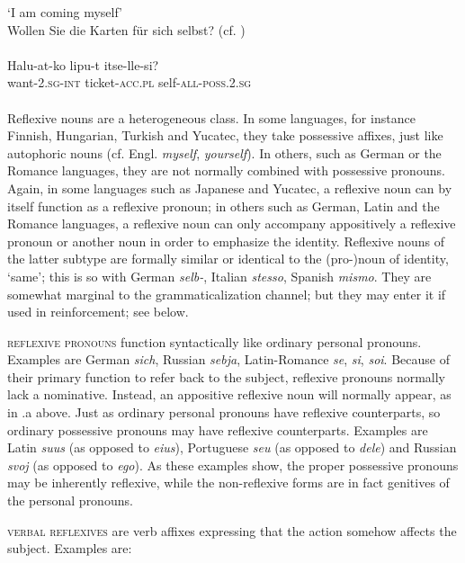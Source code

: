 \glt ‘I am coming myself’\\
\ex 
\glt Wollen Sie die Karten für sich selbst?  (cf. )\\
\z
\z
\noindent \ea\label{ex:E15}
\langinfo{\LangFinn}{}{}\\
\gll Halu-at-ko  lipu-t  itse-lle-si?\\
 want-2.\textsc{sg}-\textsc{int}  ticket-\textsc{acc}.\textsc{pl}  self-\textsc{all}-\textsc{poss}.2.\textsc{sg}\\
\\
\z
\noindent 
Reflexive nouns are a heterogeneous class. In some languages, for instance Finnish, Hungarian, Turkish and Yucatec, they take possessive affixes, just like autophoric nouns (cf. Engl. \textit{myself}, \textit{yourself}). In others, such as German or the Romance languages, they are not normally combined with possessive pronouns. Again, in some languages such as Japanese and Yucatec, a reflexive noun can by itself function as a reflexive pronoun; in others such as German, Latin and the Romance languages, a reflexive noun can only accompany appositively a reflexive pronoun or another noun in order to emphasize the identity. Reflexive nouns of the latter subtype are formally similar or identical to the (pro-)noun of identity, ‘same’; this is so with German \textit{selb-}, Italian \textit{stesso}, Spanish \textit{mismo}. They are somewhat marginal to the grammaticalization channel; but they may enter it if used in reinforcement; see below.

\textsc{reflexive pronouns} function syntactically like ordinary personal pronouns. Examples are German \textit{sich}, Russian \textit{sebja}, Latin-Romance \textit{se}, \textit{si}, \textit{soi}. Because of their primary function to refer back to the subject, reflexive pronouns normally lack a nominative. Instead, an appositive reflexive noun will normally appear, as in .a above. Just as ordinary personal pronouns have reflexive counterparts, so ordinary possessive pronouns may have reflexive counterparts. Examples are Latin \textit{suus} (as opposed to \textit{eius}), Portuguese \textit{seu} (as opposed to \textit{dele}) and Russian \textit{svoj} (as opposed to \textit{ego}). As these examples show, the proper possessive pronouns may be inherently reflexive, while the non-reflexive forms are in fact genitives of the personal pronouns.

\textsc{verbal reflexives} are verb affixes expressing that the action somehow affects the subject. Examples are:

